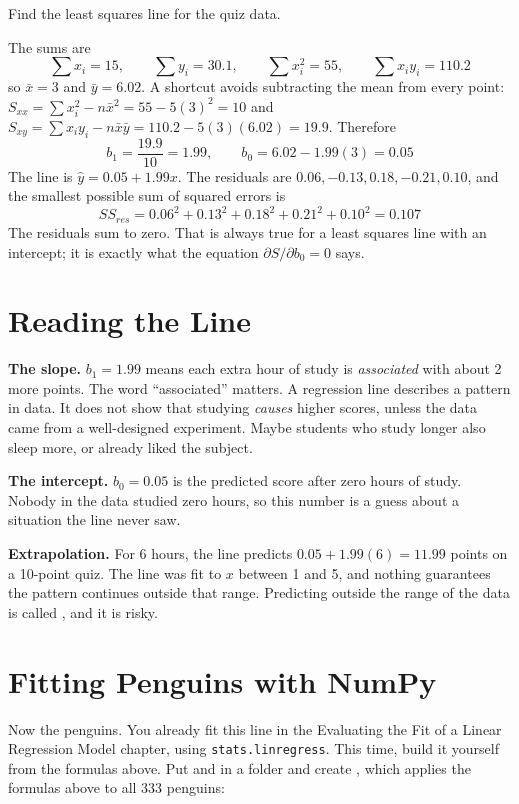 \begin{Worked}
\begin{Problem}
Find the least squares line for the quiz data.
\end{Problem}
\begin{Solution}
The sums are
$$\sum x_i = 15, \qquad \sum y_i = 30.1, \qquad \sum x_i^2 = 55, \qquad \sum x_i y_i = 110.2$$
so $\bar{x} = 3$ and $\bar{y} = 6.02$. A shortcut avoids subtracting the mean from every point:
$S_{xx} = \sum x_i^2 - n\bar{x}^2 = 55 - 5(3)^2 = 10$ and
$S_{xy} = \sum x_i y_i - n\bar{x}\bar{y} = 110.2 - 5(3)(6.02) = 19.9$. Therefore
$$b_1 = \frac{19.9}{10} = 1.99, \qquad b_0 = 6.02 - 1.99(3) = 0.05$$
The line is $\hat{y} = 0.05 + 1.99x$. The residuals are $0.06, -0.13, 0.18, -0.21, 0.10$, and the smallest
possible sum of squared errors is
$$SS_{res} = 0.06^2 + 0.13^2 + 0.18^2 + 0.21^2 + 0.10^2 = 0.107$$
The residuals sum to zero. That is always true for a least squares line with an intercept; it is exactly
what the equation $\partial S / \partial b_0 = 0$ says.
\end{Solution}
\end{Worked}

\section{Reading the Line}
\textbf{The slope.} $b_1 = 1.99$ means each extra hour of study is \emph{associated} with about 2 more points.
The word ``associated'' matters. A regression line describes a pattern in data. It does not show that
studying \emph{causes} higher scores, unless the data came from a well-designed experiment. Maybe students
who study longer also sleep more, or already liked the subject.

\textbf{The intercept.} $b_0 = 0.05$ is the predicted score after zero hours of study. Nobody in the data
studied zero hours, so this number is a guess about a situation the line never saw.

\textbf{Extrapolation.} For 6 hours, the line predicts $0.05 + 1.99(6) = 11.99$ points
on a 10-point quiz. The line was fit to $x$ between 1 and 5, and nothing guarantees the pattern continues
outside that range. Predicting outside the range of the data is called , and it is
risky.

\section{Fitting Penguins with NumPy}
Now the penguins. You already fit this line in the Evaluating the Fit of a Linear Regression Model chapter, using \verb|stats.linregress|. This time, build it yourself from the formulas above. Put  and  in a folder and create
, which applies the formulas above to all 333 penguins:

